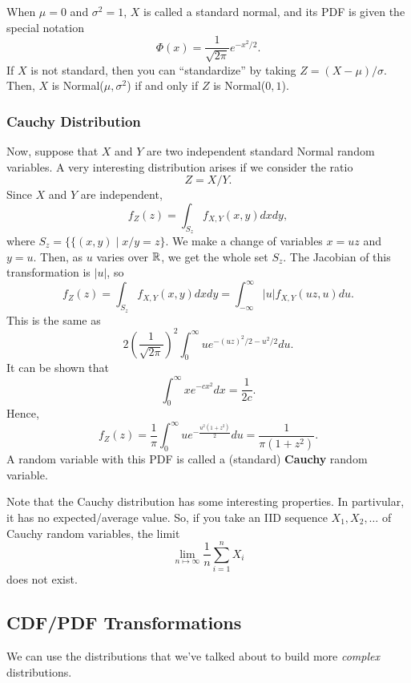 When $\mu = 0$ and $\sigma^2 = 1$, $X$ is called a standard normal, and its PDF is given the special notation 
\[\Phi(x) = \frac{1}{\sqrt{2\pi}} e^{-x^2 / 2}.\]
If $X$ is not standard, then you can ``standardize'' by taking $Z = (X - \mu) / \sigma$. Then, $X$ is Normal($\mu, \sigma^2$) if and only if $Z$ is Normal($0, 1$).

\subsubsection{Cauchy Distribution}
Now, suppose that $X$ and $Y$ are two independent standard Normal random variables. A very interesting distribution arises if we consider the ratio \[Z = X / Y.\] Since $X$ and $Y$ are independent, \[f_{Z}(z) = \int_{S_z} f_{X, Y}(x, y) dx dy,\] where $S_z = \{\{(x, y) \mid x / y = z\}$. We make a change of variables $x = uz$ and $y = u$. Then, as $u$ varies over $\mathbb{R}$, we get the whole set $S_z$. The Jacobian of this transformation is $|u|$, so 
\[f_{Z}(z) = \int_{S_z} f_{X, Y}(x, y) dxdy = \int_{-\infty}^{\infty} |u| f_{X, Y}(uz, u) du.\]
This is the same as 
\[2\left(\frac{1}{\sqrt{2\pi}}\right)^2 \int_{0}^{\infty} ue^{-(uz)^2 / 2 - u^2 / 2} du.\]
It can be shown that 
\[\int_0^{\infty} xe^{-cx^2} dx = \frac{1}{2c}.\]
Hence,
\[f_{Z}(z) = \frac{1}{\pi} \int_0^{\infty} ue^{-\frac{u^2 (1 + z^2)}{2}} du = \frac{1}{\pi (1 + z^2)}.\]
A random variable with this PDF is called a (standard) \textbf{Cauchy} random variable. 

\bigskip 

Note that the Cauchy distribution has some interesting properties. In partivular, it has no expected/average value. So, if you take an IID sequence $X_1, X_2, \dots$ of Cauchy random variables, the limit 
\[\lim_{n \mapsto \infty} \frac{1}{n} \sum_{i = 1}^n X_i\]
does not exist. 



\subsection{CDF/PDF Transformations}
We can use the distributions that we've talked about to build more \emph{complex} distributions. 


